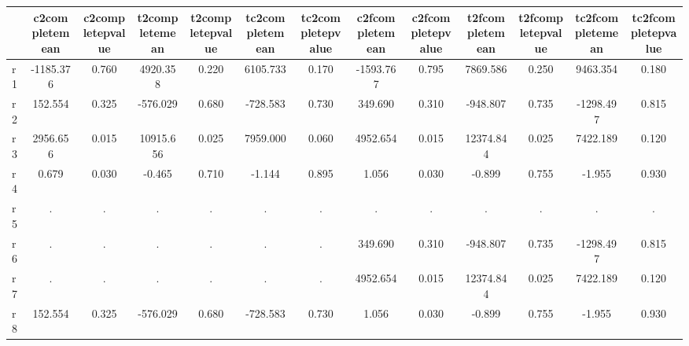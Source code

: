 \begin{table}[htbp]
\begin{tabular}{lcccccccccccc} \hline \hline
 & c2completemean  & c2completepvalue  & t2completemean  & t2completepvalue  & tc2completemean  & tc2completepvalue  & c2fcompletemean  & c2fcompletepvalue  & t2fcompletemean  & t2fcompletepvalue  & tc2fcompletemean  & tc2fcompletepvalue  \\  \hline 
r1 & -1185.376 &     0.760 &  4920.358 &     0.220 &  6105.733 &     0.170 & -1593.767 &     0.795 &  7869.586 &     0.250 &  9463.354 &     0.180 \\  
r2 &   152.554 &     0.325 &  -576.029 &     0.680 &  -728.583 &     0.730 &   349.690 &     0.310 &  -948.807 &     0.735 & -1298.497 &     0.815 \\  
r3 &  2956.656 &     0.015 & 10915.656 &     0.025 &  7959.000 &     0.060 &  4952.654 &     0.015 & 12374.844 &     0.025 &  7422.189 &     0.120 \\  
r4 &     0.679 &     0.030 &    -0.465 &     0.710 &    -1.144 &     0.895 &     1.056 &     0.030 &    -0.899 &     0.755 &    -1.955 &     0.930 \\  
r5 &         . &         . &         . &         . &         . &         . &         . &         . &         . &         . &         . &         . \\  
r6 &         . &         . &         . &         . &         . &         . &   349.690 &     0.310 &  -948.807 &     0.735 & -1298.497 &     0.815 \\  
r7 &         . &         . &         . &         . &         . &         . &  4952.654 &     0.015 & 12374.844 &     0.025 &  7422.189 &     0.120 \\  
r8 &   152.554 &     0.325 &  -576.029 &     0.680 &  -728.583 &     0.730 &     1.056 &     0.030 &    -0.899 &     0.755 &    -1.955 &     0.930 \\  
\hline \hline \end{tabular}
\end{table}
